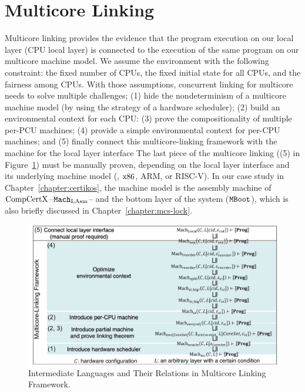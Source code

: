 \section{Multicore Linking}
\label{chapter:linking:sec:multicore-linking}

Multicore linking provides the evidence that the program execution on
our local layer (CPU local layer) is connected to the execution of the same program on our multicore machine model. 
We assume the environment with the following constraint:
the fixed number of CPUs, the fixed initial state for all CPUs,
and the fairness among CPUs.
With those assumptions, 
concurrent linking for multicore needs to solve multiple challenges;
(1) hide the nondeterminism of a multicore machine model (by using the strategy of a hardware scheduler);
(2) build an environmental context for each CPU:
(3) prove the compositionality of multiple per-PCU machines;
(4) provide a simple environmental context for per-CPU machines;
and (5) finally connect this multicore-linking framework with the machine for the local layer interface
The last piece of the multicore linking ((5) in Figure~\ref{fig:chapter:conlink:intermediate-languages-and-their-relationsihps-for-multicore-linking}) 
must be manually proven, depending on the local layer interface and its underlying machine model (\ie, $\mathrm{x86}$, ARM, or RISC-V).
In our case study in Chapter~\ref{chapter:certikos}, the machine model is the assembly machine of $\mathrm{CompCertX}$--${\mathrm{\texttt{Mach}}}_{\mathrm{LAsm}}$--
and the bottom layer of the system (${\mathrm{\texttt{MBoot}}}$), which is also briefly discussed in Chapter~\ref{chapter:mcs-lock}.
\begin{figure}
\begin{center}
\includegraphics[width=\textwidth, page=1]{figs/conlink/concurrent_linking}
\end{center}
\caption{Intermediate Languages and Their Relations in Multicore Linking Framework.}
\label{fig:chapter:conlink:intermediate-languages-and-their-relationsihps-for-multicore-linking}
\end{figure}
